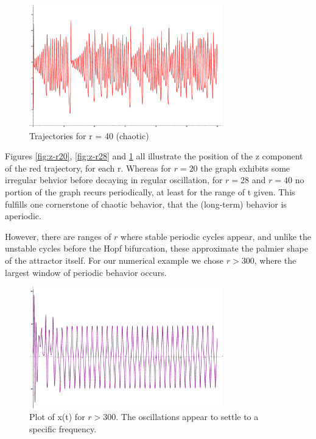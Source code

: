 \documentclass{report}
\begin{document}
\begin{figure}[ht]
  \centering
  \includegraphics[width=0.75\textwidth]{z-r40.eps}
  \caption{Trajectories for r = 40 (chaotic)}
  \label{fig:z-r40}
\end{figure}

Figures \ref{fig:z-r20}, \ref{fig:z-r28} and \ref{fig:z-r40} all illustrate the
position of the z component of the red trajectory, for each r. Whereas for
\(r=20\) the graph exhibits some irregular behvior before decaying in regular
oscillation, for \(r=28\) and \(r=40\) no portion of the graph recurs
periodically, at least for the range of t given. This fulfills one cornerstone
of chaotic behavior, that the (long-term) behavior is aperiodic.

However, there are ranges of \(r\) where stable periodic cycles appear, and
unlike the unstable cycles before the Hopf bifurcation, these approximate the
palmier shape of the attractor itself. For our numerical example we chose
\(r > 300\), where the largest window of periodic behavior occurs.


\begin{figure}[ht]
  \centering
  \includegraphics[width=0.75\textwidth]{purplex.eps}
  \caption{Plot of x(t) for \(r > 300\). The oscillations appear to settle
to a specific frequency.}
  \label{fig:bigr-x}
\end{figure}
\end{document}
